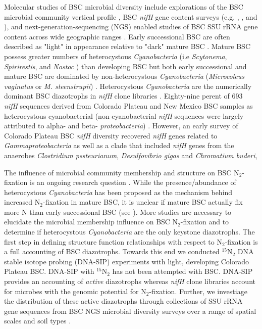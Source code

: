 Molecular studies of BSC microbial diversity include explorations of the BSC
microbial community vertical profile \citep{Garcia_Pichel_2003}, BSC
\textit{nifH} gene content surveys (e.g. \citet{14766579}, \citet{Yeager_2012},
\citet{Yeager} and \citet{Steppe_1996}), and next-generation-sequencing (NGS)
enabled studies of BSC SSU rRNA gene content across wide geographic ranges
\citep{Garcia_Pichel_2013, Steven_2013}. Early successional  BSC are often
described as "light" in appearance relative to "dark" mature BSC
\citep{Belnap_2002, 14766579}. Mature BSC possess greater numbers of
heterocystous \textit{Cyanobacteria} (i.e \textit{Scytonema},
\textit{Spirirestis}, and \textit{Nostoc} \citep{Yeager, Yeager_2012}) than
developing BSC but both early successional and mature BSC are dominated by
non-heterocystous \textit{Cyanobacteria} (\textit{Microcoleus vaginatus} or
\textit{M. steenstrupii}) \citep{14766579, Garcia_Pichel_2013}.  Heterocystous
\textit{Cyanobacteria} are the numerically dominant BSC diazotrophs in
\textit{nifH} clone libraries \citep{Yeager, 14766579, Yeager_2012}.
Eighty-nine perent of 693 \textit{nifH} sequences derived from Colorado Plateau and
New Mexico BSC samples as heterocystous cyanobacterial (non-cyanobacterial
\textit{nifH} sequences were largely attributed to alpha- and beta-
\textit{proteobacteria}) \citet{Yeager}. However, an early survey of Colorado
Plateau BSC \textit{nifH} diversity recovered \textit{nifH} genes related to
\textit{Gammaproteobacteria} as well as a clade that included \textit{nifH}
genes from the anaerobes \textit{Clostridium pssteurianum},
\textit{Desulfovibrio gigas} and \textit{Chromatium buderi},

The influence of microbial community membership and structure on BSC
N$_{2}$-fixation is an ongoing research question \citep{Belnap28062013}. While
the presence/abundance of heterocystous \textit{Cyanobacteria} has been
proposed as the mechanism behind increased N$_{2}$-fixation in mature BSC, it
is unclear if mature BSC actually fix more N than early successional BSC (see
\citet{15643930}). More studies are necessary to elucidate the microbial
membership influence on BSC N$_{2}$-fixation and to determine if heterocystous
\textit{Cyanobacteria} are the only keystone diazotrophs. The first step in
defining structure function relationships with respect to N$_{2}$-fixation is a
full accounting of BSC diazotrophs. Towards this end we conducted
$^{15}$N$_{2}$ DNA stable isotope probing (DNA-SIP) experiments with light,
developing Colorado Plateau BSC.  DNA-SIP with $^{15}$N$_{2}$ has not been
attempted with BSC. DNA-SIP provides an accounting of \textit{active}
diazotrophs whereas \textit{nifH} clone libraries account for microbes with the
genomic potential for N$_{2}$-fixation.  Further, we investiage the
distribution of these active diazotrophs through collections of SSU rRNA
gene sequences from BSC NGS microbial diversity surveys over a range of spatial
scales and soil types \citep{Garcia_Pichel_2013, Steven_2013}. 
